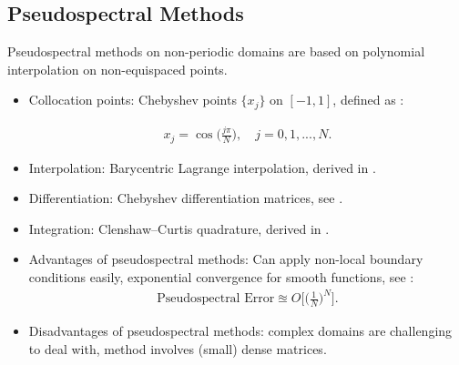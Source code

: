 \documentclass[a0,portrait]{a0poster}
\begin{document}
\begin{multicols}{2}
\subsection*{Pseudospectral Methods}

Pseudospectral methods on non-periodic domains are based on polynomial interpolation on non-equispaced points. 

\begin{itemize}
	\item 

Collocation points: Chebyshev points $\{x_j\}$ on $[-1,1]$, defined as \cite{bibTrefethen}:

\begin{align*}
x_j= \cos\bigg(\frac{j \pi}{N}\bigg), \quad j=0,1,...,N.
\end{align*}	


\item
Interpolation: Barycentric Lagrange interpolation, derived in \cite{bibTrefethenBerrut1}.
\item 
Differentiation: Chebyshev differentiation matrices, see \cite{bibTrefethen}.
\item
Integration: Clenshaw--Curtis quadrature, derived in \cite{ClenCurt1}.
\item 
Advantages of pseudospectral methods: Can apply non-local boundary conditions easily, exponential convergence for smooth functions, see \cite{Boyd1}:
\begin{align*}
\text{Pseudospectral Error} \approxeq O \bigg[ \bigg( \frac{1}{N} \bigg)^N \bigg].
\end{align*}
\item  
Disadvantages of pseudospectral methods: complex domains are challenging to deal with, method involves (small) dense matrices. 
\end{itemize} 



\end{multicols}
\end{document}
